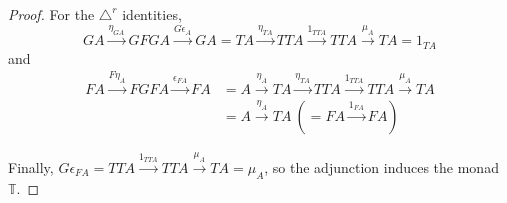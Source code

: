 \documentclass[a4paper]{article}
\theoremstyle{definition}
\theoremstyle{remark}
\theoremstyle{default}
\numberwithin{definition}{section}
\begin{document}
\begin{proof}
	For the $\triangle^r$ identities,
	$$GA \overset{\eta_{GA}}{\to} GFGA \overset{G\epsilon_A}{\to} GA = TA \overset{\eta_{TA}}{\to} TTA \overset{1_{TTA}}{\to} TTA \overset{\mu_A}{\to} TA = 1_{TA}$$
	and
	\begin{align*}
		FA \overset{F\eta_A}{\to} FGFA \overset{\epsilon_{FA}}{\to} FA &= A \overset{\eta_A}{\to} TA \overset{\eta_{TA}}{\to} TTA \overset{1_{TTA}}{\to} TTA \overset{\mu_A}{\to} TA \\
		&= A \overset{\eta_A}{\to} TA\ (= FA \overset{1_{FA}}{\to} FA)
	\end{align*}
	
	Finally, $G\epsilon_{FA} = TTA \overset{1_{TTA}}{\to} TTA \overset{\mu_A}{\to} TA = \mu_A$,
	so the adjunction induces the monad $\mathbb{T}$.
\end{proof}
\end{document}
